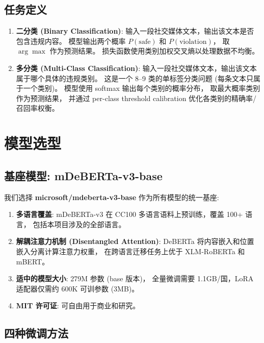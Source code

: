 \documentclass[11pt,a4paper]{article}
\begin{document}
\subsection{任务定义}

\begin{enumerate}[itemsep=3pt]
\item \textbf{二分类 (Binary Classification)}:
输入一段社交媒体文本，输出该文本是否包含违规内容。
模型输出两个概率 $P(\text{safe})$ 和 $P(\text{violation})$，
取 $\arg\max$ 作为预测结果。
损失函数使用类别加权交叉熵以处理数据不均衡。

\item \textbf{多分类 (Multi-Class Classification)}:
输入一段社交媒体文本，输出该文本属于哪个具体的违规类别。
这是一个 8--9 类的单标签分类问题 (每条文本只属于一个类别)。
模型使用 softmax 输出每个类别的概率分布，
取最大概率类别作为预测结果，
并通过 per-class threshold calibration 优化各类别的精确率/召回率权衡。
\end{enumerate}

\section{模型选型}

\subsection{基座模型: mDeBERTa-v3-base}

我们选择 \textbf{microsoft/mdeberta-v3-base} 作为所有模型的统一基座:

\begin{enumerate}[itemsep=2pt]
\item \textbf{多语言覆盖}: mDeBERTa-v3 在 CC100 多语言语料上预训练，覆盖 100+ 语言，
包括本项目涉及的全部语言。
\item \textbf{解耦注意力机制 (Disentangled Attention)}:
DeBERTa 将内容嵌入和位置嵌入分离计算注意力权重，
在跨语言迁移任务上优于 XLM-RoBERTa 和 mBERT。
\item \textbf{适中的模型大小}: 279M 参数 (base 版本)，
全量微调需要 1.1GB/国，LoRA 适配器仅需约 600K 可训参数 (3MB)。
\item \textbf{MIT 许可证}: 可自由用于商业和研究。
\end{enumerate}

\subsection{四种微调方法}
\end{document}
